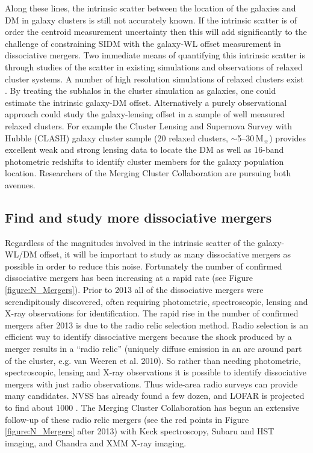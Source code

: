 Along these lines, the intrinsic scatter between the location of the galaxies and DM in galaxy clusters is still not accurately known.
If the intrinsic scatter is of order the centroid measurement uncertainty then this will add significantly to the challenge of constraining SIDM with the galaxy-WL offset measurement in dissociative mergers.
Two immediate means of quantifying this intrinsic scatter is through studies of the scatter in existing simulations and observations of relaxed cluster systems.
A number of high resolution simulations of relaxed clusters exist \citep[e.g.][which include both CDM and SIDM simulations]{Peter:2012vi, Rocha:2012tr}.
By treating the subhalos in the cluster simulation as galaxies, one could estimate the intrinsic galaxy-DM offset.
Alternatively a purely observational approach could study the galaxy-lensing offset in a sample of well measured relaxed clusters.
For example the Cluster Lensing and Supernova Survey with Hubble (CLASH) galaxy cluster sample (20 relaxed clusters, $\sim$5--30\,M$_\sun$) provides excellent weak and strong lensing data to locate the DM as well as 16-band photometric redshifts to identify cluster members for the galaxy population location.
Researchers of the Merging Cluster Collaboration are pursuing both avenues.

\subsection{Find and study more dissociative mergers}

Regardless of the magnitudes involved in the intrinsic scatter of the galaxy-WL/DM offset, it will be important to study as many dissociative mergers as possible in order to reduce this noise.
Fortunately the number of confirmed dissociative mergers has been increasing at a rapid rate (see Figure \ref{figure:N_Mergers}).
Prior to 2013 all of the dissociative mergers were serendipitously discovered, often requiring photometric, spectroscopic, lensing and X-ray observations for identification.
The rapid rise in the number of confirmed mergers after 2013 is due to the radio relic selection method.
Radio selection is an efficient way to identify dissociative mergers because the shock produced by a merger results in a ``radio relic'' (uniquely diffuse emission in an arc around part of the cluster, e.g. van Weeren et al. 2010).
So rather than needing photometric, spectroscopic, lensing and X-ray observations it is possible to identify dissociative mergers with just radio observations.
Thus wide-area radio surveys can provide many candidates. 
NVSS has already found a few dozen, and LOFAR is projected to find about 1000 \citep{Nuza:2012fu}.
The Merging Cluster Collaboration has begun an extensive follow-up of these radio relic mergers (see the red points in Figure \ref{figure:N_Mergers} after 2013) with Keck spectroscopy, Subaru and HST imaging, and Chandra and XMM X-ray imaging.

